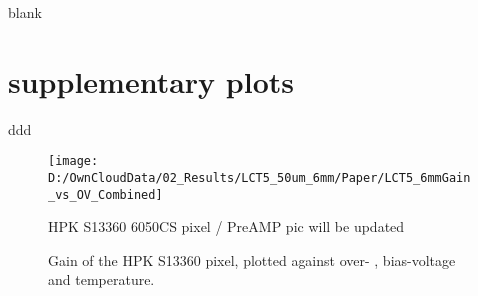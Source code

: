 \documentclass[article,type=msc,colorback,accentcolor=tud9c]{tudthesis}
\begin{document}
\newpage
blank
\newpage
\newpage

\section{supplementary plots}ddd

\begin{wrapfigure}{R}{0.55\textwidth}
\centering
\texttt{[image: D:/OwnCloudData/02\_Results/LCT5\_50um\_6mm/Paper/LCT5\_6mmGain\_vs\_OV\_Combined]}
\caption{\label{fig:S13360_pixel}HPK S13360 6050CS pixel / PreAMP pic will be updated}
\end{wrapfigure}



\begin{figure}[h]
\begin{centering}
\caption{Gain of the HPK S13360 pixel, plotted against over- , bias-voltage and temperature. }
\label{fig:S13360_Gain}
\end{centering}
\end{figure}





\newpage
\end{document}
